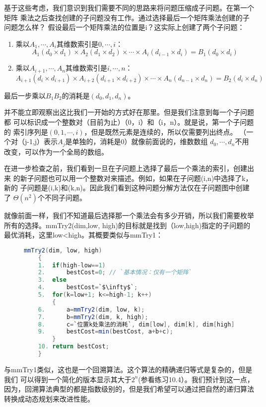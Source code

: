 基于这些考虑，我们意识到我们需要不同的思路来将问题压缩成子问题。在第一个矩阵
乘法之后查找创建的子问题没有工作。通过选择最后一个矩阵乘法创建的子问题怎么样？
假设最后一个矩阵乘法的位置是i？这实际上创建了两个子问题：
\begin{enumerate}
\item 乘以$A_1, \cdots, A_i$其维数索引是$0, \cdots, i$：
        \begin{displaymath}
            A_1(d_0\times d_1) \times A_2(d_1\times d_2)\times \cdots  \times A_i(d_{i-1}\times d_i) =B_1(d_0\times d_i)
        \end{displaymath}
\item 乘以$A_{i+1}, \cdots, A_n$其维数索引是$i, \cdots, n$：
        \begin{displaymath}
            A_{i+1}(d_i\times d_{i+1}) \times A_{i+2}(d_{i+1}\times d_{i+2})\times \cdots \times A_n(d_{n-1}\times d_n) =B_2(d_i\times d_n)
        \end{displaymath}
\end{enumerate}

最后一步乘以$B_1B_2$的消耗是$(d_0, d_1, d_n)$。

并不能立即观察出这比我们一开始的方式好在那里。但是我们注意到每一个子问题都
可以标识成一个整数对（目前为止）（0，i）和（i，n）。就是说，第一个子问题的
索引序列是$(0, 1, \cdots, i)$，但是既然元素是连续的，所以仅需要列出终点。
（一个对（j-1,j）表示$A_j$是单独的，消耗是0）就像前面说的，维数数组
$d_0, \cdots, d_n$不用改变，可以作为一个全局的数组。

在进一步检查之前，我们看到一旦在子问题上选择了最后一个乘法的索引，创建出来
的新子问题也可以用一个整数对来描述。例如，如果在子问题(i,n)中选择了k，新的
子问题是(i,k)和(k,n)。因此我们看到这种问题分解方法仅在子问题图中创建了
$\Theta(n^2)$个不同子问题。

就像前面一样，我们不知道最后选择那一个乘法会有多少开销，所以我们需要枚举
所有的选择。mmTry2(dim,low, high)的目标就是找到（low,high)指定的子问题的
最优消耗，这里low<high。其概要类似与mmTry1：
\begin{figure}
\begin{lstlisting}[language={Java},keywordstyle=\color{blue!70}, commentstyle=\color{red!50!green!50!blue!50}]
    mmTry2(dim, low, high)
    {
    1.  if(high-low==1)
    2.      bestCost=0; // `基本情况：仅有一个矩阵`
    3.  else
    4.      bestCost=`$\infty$`;
    5.  for(k=low+1; k<=high-1; k++)
        {
    6.      a=mmTry2(dim, low, k);
    7.      b=mmTry2(dim, k, high);
    8.      c=`位置k处乘法的消耗`, dim[low], dim[k], dim[high]
    9.      bestCost=min(bestCost, a+b+c);
        }
    10. return bestCost;
    }
\end{lstlisting}
\end{figure}
与mmTry1类似，这也是一个回溯算法。这个算法的精确递归等式是复杂的，但是我们
可以得到一个简化的版本显示其大于$2^n$(参看练习10.4）。我们预计到这一点，
因为，回溯算法典型的都是指数级别的，但是我们希望可以通过把自然的递归算法
转换成动态规划来改进性能。

